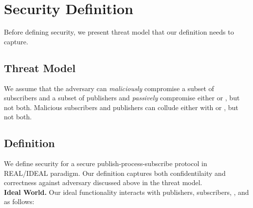 \section{Security Definition}
\label{sec:definition}

Before defining security, we present threat model that our definition needs to
capture.


\subsection{Threat Model} We assume that the adversary can \emph{maliciously}
compromise a subset of subscribers and a subset of publishers and
\emph{passively} compromise either \broker or \garbler, but not both.
Malicious subscribers and publishers can collude either with \garbler or
\broker, but not both.

\subsection{Definition}

We define security for a secure publish-process-subscribe protocol in
REAL/IDEAL paradigm. Our definition captures both confidentilaity and
correctness against adversary discussed above in the threat model.\\[6pt]
\noindent\textbf{Ideal World.}
Our ideal functionality \F interacts with publishers, subscribers, \broker, and
\garbler as follows:

